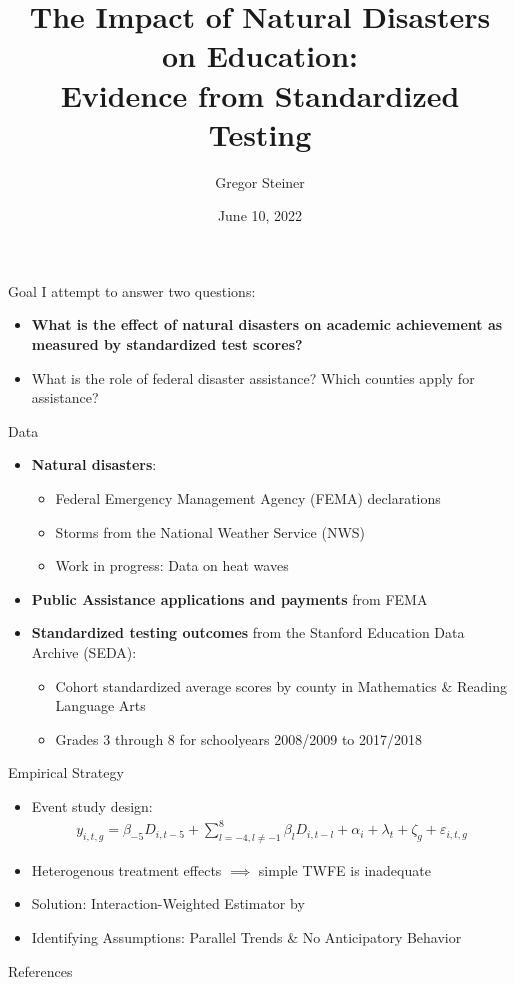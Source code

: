 \documentclass[hyperref={colorlinks = true,linkcolor = blue, citecolor=blue,urlcolor=blue}]{beamer}
\title{The Impact of Natural Disasters on Education: \\ Evidence from Standardized Testing}
\author{Gregor Steiner}
\date{June 10, 2022}
\begin{document}
	
	
	
\begin{frame}[plain]
    \maketitle
\end{frame}

\begin{frame}{Goal}
	I attempt to answer two questions:
	\begin{itemize}
		\item \textbf{What is the effect of natural disasters on academic achievement as measured by standardized test scores?}
		\item What is the role of federal disaster assistance? Which counties apply for assistance?
	\end{itemize}
\end{frame}

\begin{frame}{Data}
	\begin{itemize}
		\item \textbf{Natural disasters}:
		\begin{itemize}
			\item Federal Emergency Management Agency (FEMA) declarations 
			\item Storms from the National Weather Service (NWS)
			\item Work in progress: Data on heat waves
		\end{itemize}
		\item \textbf{Public Assistance applications and payments} from FEMA
		\item \textbf{Standardized testing outcomes} from the Stanford Education Data Archive (SEDA):
		\begin{itemize}
			\item Cohort standardized average scores by county in Mathematics \& Reading Language Arts
			\item Grades 3 through 8 for schoolyears 2008/2009 to 2017/2018
		\end{itemize}
	\end{itemize}
\end{frame}

\begin{frame}{Empirical Strategy}
	\begin{itemize}
		\item Event study design:
		\begin{align*}
			y_{i, t, g} = \beta_{-5}  D_{i, t-5} + \sum_{l = -4, l \neq -1}^{8} \beta_l D_{i, t-l} + \alpha_i + \lambda_t + \zeta_g + \varepsilon_{i, t, g}
		\end{align*}
		\item Heterogenous treatment effects $\implies$ simple TWFE is inadequate \citep{deChaisemartin_2020}
		\item Solution: Interaction-Weighted Estimator by \cite{Sun_2021}
		\item Identifying Assumptions: Parallel Trends \& No Anticipatory Behavior
	\end{itemize}
\end{frame}


\begin{frame}{References}
	
	
\end{frame}
\end{document}
